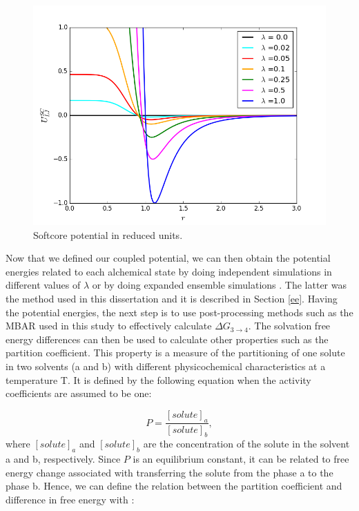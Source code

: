     \begin{figure}[H]
    	\centering
    	\includegraphics[width=0.9\linewidth]{Figures/soft}
    	\caption{Softcore potential in reduced units.}
    	\label{fig:SC}
    \end{figure}
    
    Now that we defined our coupled potential, we can then obtain the potential energies related to each alchemical state by doing independent simulations in different values of $\lambda$ or by doing expanded ensemble simulations \cite{lyubartsev}. The latter was the method used in this dissertation and it is described in Section \ref{ee}. Having the potential energies, the next step is to use post-processing methods such as the MBAR used in this study to effectively calculate $\Delta G_{3 \rightarrow 4}$.  The solvation free energy differences can then be used to calculate other properties such as the partition coefficient. This property is a measure of the partitioning of one solute in two solvents (a and b) with different physicochemical characteristics  at a temperature T. It is defined by the following equation when the activity coefficients are assumed to be one:
    
    \begin{equation}
    P = \dfrac{[solute]_{a}}{[solute]_{b}},
    \end{equation} 
    where $[solute]_{a}$ and $[solute]_{b}$ are the concentration of the solute in the solvent a and b, respectively. Since $P$ is an equilibrium constant, it can be related to free energy change associated with transferring the solute from the phase a to the phase b. Hence, we can define the relation between the partition coefficient and difference in free energy with \cite{doi:10.1021/ja00036a009}:  
    

